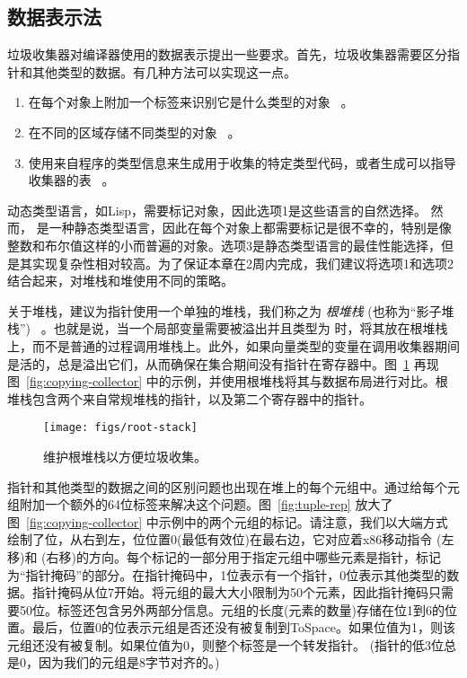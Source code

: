 \documentclass[11pt]{book}
\begin{document}
\subsection{数据表示法}
\label{sec:data-rep-gc}

垃圾收集器对编译器使用的数据表示提出一些要求。首先，垃圾收集器需要区分指针和其他类型的数据。有几种方法可以实现这一点。
\begin{enumerate}
\item 在每个对象上附加一个标签来识别它是什么类型的对象~\citep{McCarthy:1960dz} 。
\item 在不同的区域存储不同类型的对象~\citep{Steele:1977ab} 。
\item 使用来自程序的类型信息来生成用于收集的特定类型代码，或者生成可以指导收集器的表~\citep{Appel:1989aa,Goldberg:1991aa,Diwan:1992aa} 。
\end{enumerate}

动态类型语言，如Lisp，需要标记对象，因此选项1是这些语言的自然选择。
然而， \LangVec{} 是一种静态类型语言，因此在每个对象上都需要标记是很不幸的，特别是像整数和布尔值这样的小而普遍的对象。选项3是静态类型语言的最佳性能选择，但是其实现复杂性相对较高。为了保证本章在2周内完成，我们建议将选项1和选项2结合起来，对堆栈和堆使用不同的策略。

关于堆栈，建议为指针使用一个单独的堆栈，我们称之为 \emph{根堆栈} (也称为“影子堆栈”)~\citep{Siebert:2001aa,Henderson:2002aa,Baker:2009aa} 。也就是说，当一个局部变量需要被溢出并且类型为
 时，将其放在根堆栈上，而不是普通的过程调用堆栈上。此外，如果向量类型的变量在调用收集器期间是活的，总是溢出它们，从而确保在集合期间没有指针在寄存器中。图~\ref{fig:shadow-stack} 再现图~\ref{fig:copying-collector} 中的示例，并使用根堆栈将其与数据布局进行对比。根堆栈包含两个来自常规堆栈的指针，以及第二个寄存器中的指针。

\begin{figure}[tbp]
\centering \texttt{[image: figs/root-stack]}
\caption{维护根堆栈以方便垃圾收集。}
\label{fig:shadow-stack}
\end{figure}

指针和其他类型的数据之间的区别问题也出现在堆上的每个元组中。通过给每个元组附加一个额外的64位标签来解决这个问题。图~\ref{fig:tuple-rep} 放大了图~\ref{fig:copying-collector} 中示例中的两个元组的标记。请注意，我们以大端方式绘制了位，从右到左，位位置0(最低有效位)在最右边，它对应着x86移动指令
 (左移)和  (右移)的方向。每个标记的一部分用于指定元组中哪些元素是指针，标记为“指针掩码”的部分。在指针掩码中，1位表示有一个指针，0位表示其他类型的数据。指针掩码从位7开始。将元组的最大大小限制为50个元素，因此指针掩码只需要50位。标签还包含另外两部分信息。元组的长度(元素的数量)存储在位1到6的位置。最后，位置0的位表示元组是否还没有被复制到ToSpace。如果位值为1，则该元组还没有被复制。如果位值为0，则整个标签是一个转发指针。 (指针的低3位总是0，因为我们的元组是8字节对齐的。)
\end{document}
